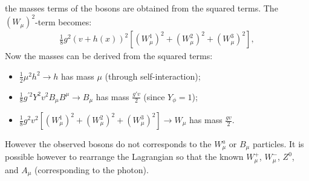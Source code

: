 the masses terms of the bosons are obtained from the squared terms. The $(W_\mu)^2$-term becomes:
\begin{eqnarray}
\frac{1}{8}g^2 (v + h(x))^2 \left[\left(W_\mu^1\right)^2 + \left(W_\mu^2\right)^2 + \left(W_\mu^3\right)^2 \right], 
\label{eqn:Wsquaredterm}
\end{eqnarray}
Now the masses can be derived from the squared terms:
\begin{itemize}
	\item $\frac{1}{2}\mu^2h^2 \rightarrow h$ has mass $\mu$ (through self-interaction);
	\item $\frac{1}{8}g^{'2}Y^2v^2B_\mu B^\mu \rightarrow B_\mu$ has mass $\frac{g'v}{2}$ (since $Y_\phi =1$);
	\item $\frac{1}{8}g^2 v^2 \left[\left(W_\mu^1\right)^2 + \left(W_\mu^2\right)^2 + \left(W_\mu^3\right)^2 \right] \rightarrow W_\mu $ has mass $\frac{gv}{2}$.
\end{itemize}

However the observed bosons do not corresponds to the $W_\mu^a$ or $B_\mu$ particles. It is possible however to rearrange the Lagrangian so that the known $W_\mu^+$, $W_\mu^-$, $Z^0$, and $A_\mu$ (corresponding to the photon).

